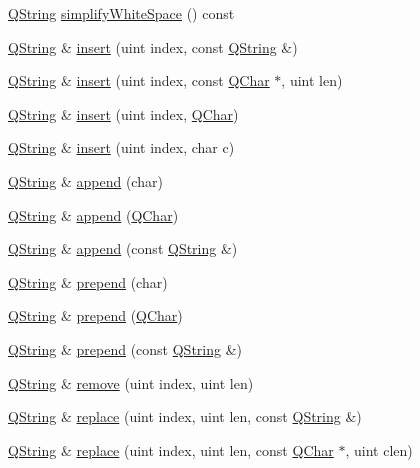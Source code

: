 \begin{DoxyCompactItemize}
\hyperlink{class_q_string}{Q\-String} \hyperlink{class_q_string_a1e5f7cddfe90398e6785b40f503d05af}{simplify\-White\-Space} () const 
\item 
\hyperlink{class_q_string}{Q\-String} \& \hyperlink{class_q_string_abe3665c200ad705e4cf268a7d91081df}{insert} (uint index, const \hyperlink{class_q_string}{Q\-String} \&)
\item 
\hyperlink{class_q_string}{Q\-String} \& \hyperlink{class_q_string_a8c22c6012b77574f78c6f141c79567d1}{insert} (uint index, const \hyperlink{class_q_char}{Q\-Char} $\ast$, uint len)
\item 
\hyperlink{class_q_string}{Q\-String} \& \hyperlink{class_q_string_aeb0942a7a4dbaa4aca093afa283ea362}{insert} (uint index, \hyperlink{class_q_char}{Q\-Char})
\item 
\hyperlink{class_q_string}{Q\-String} \& \hyperlink{class_q_string_a667802067bb355738ded2067b31182b0}{insert} (uint index, char c)
\item 
\hyperlink{class_q_string}{Q\-String} \& \hyperlink{class_q_string_aabf9bf5642d9d0d2dd981efb72d3381f}{append} (char)
\item 
\hyperlink{class_q_string}{Q\-String} \& \hyperlink{class_q_string_a212e7dfd5073111079d4039d65521247}{append} (\hyperlink{class_q_char}{Q\-Char})
\item 
\hyperlink{class_q_string}{Q\-String} \& \hyperlink{class_q_string_a723ea3a24cd75492d2353f91c8824643}{append} (const \hyperlink{class_q_string}{Q\-String} \&)
\item 
\hyperlink{class_q_string}{Q\-String} \& \hyperlink{class_q_string_a87419fc55e3059c82b799fcc4dd8d6ab}{prepend} (char)
\item 
\hyperlink{class_q_string}{Q\-String} \& \hyperlink{class_q_string_a6a72632b11e6ff6b08817b01e6c98fec}{prepend} (\hyperlink{class_q_char}{Q\-Char})
\item 
\hyperlink{class_q_string}{Q\-String} \& \hyperlink{class_q_string_ad1fabd2b24b24bb771ca6a2e90732592}{prepend} (const \hyperlink{class_q_string}{Q\-String} \&)
\item 
\hyperlink{class_q_string}{Q\-String} \& \hyperlink{class_q_string_a4647cd8a50579dbbc029f1d53d51af52}{remove} (uint index, uint len)
\item 
\hyperlink{class_q_string}{Q\-String} \& \hyperlink{class_q_string_adad527f16b6d31fee94bd8d8233ede2b}{replace} (uint index, uint len, const \hyperlink{class_q_string}{Q\-String} \&)
\item 
\hyperlink{class_q_string}{Q\-String} \& \hyperlink{class_q_string_a17c80b9114f21404471525ccbf19caf4}{replace} (uint index, uint len, const \hyperlink{class_q_char}{Q\-Char} $\ast$, uint clen)

\end{DoxyCompactItemize}
